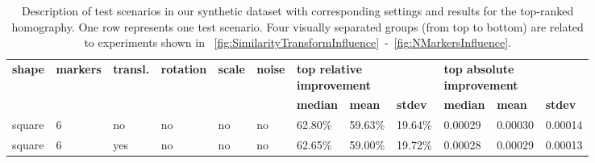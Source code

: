 \def\tblsccolw{0.06}
\def\tblrscolw{0.08}
\begin{table}[t]
    \caption{Description of test scenarios in our synthetic dataset with corresponding settings and results for the top-ranked homography. One row represents one test scenario. Four visually separated groups (from top to bottom) are related to experiments shown in \figstr{}~\ref{fig:SimilarityTransformInfluence}~-~\ref{fig:NMarkersInfluence}.}
    \label{tab:TestScenariosResults}
    \setlength{\tabcolsep}{3pt}
    \begin{center}
        \footnotesize
        \begin{tabular}{p{\tblsccolw\linewidth}p{\tblsccolw\linewidth}p{\tblsccolw\linewidth}p{\tblsccolw\linewidth}p{\tblsccolw\linewidth}p{\tblsccolw\linewidth}|p{\tblrscolw\linewidth}p{\tblrscolw\linewidth}p{\tblrscolw\linewidth}p{\tblrscolw\linewidth}p{\tblrscolw\linewidth}p{\tblrscolw\linewidth}}
            \toprule
            \multirow{2}{2pt}{\textbf{shape}}    &
            \multirow{2}{2pt}{\textbf{markers}}  &
            \multirow{2}{2pt}{\textbf{transl.}}  &
            \multirow{2}{2pt}{\textbf{rotation}} &
            \multirow{2}{2pt}{\textbf{scale}}    &
            \multirow{2}{2pt}{\textbf{noise}}    & \multicolumn{3}{l}{\textbf{top relative improvement}} & \multicolumn{3}{l}{\textbf{top absolute improvement}}                                                                                                         \\
                                                 &                                                       &                                                       &     &     &     & \textbf{median} & \textbf{mean} & \textbf{stdev} &
            \textbf{median}                      & \textbf{mean}                                         & \textbf{stdev}                                                                                                                                                \\
            \midrule
            square                               & 6                                                     & no                                                    & no  & no  & no  & 62.80\%         & 59.63\%       & 19.64\%        & 0.00029  & 0.00030   & 0.00014   \\
            square                               & 6                                                     & yes                                                   & no  & no  & no  & 62.65\%         & 59.00\%       & 19.72\%        & 0.00028  & 0.00029   & 0.00013   \\

\end{tabular}
\end{center}
\end{table}
